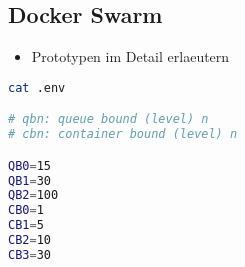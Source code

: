 \subsection{Docker Swarm}

\begin{itemize}
  \item Prototypen im Detail erlaeutern
\end{itemize}


\renewcommand\theadalign{bc}
\renewcommand\theadfont{\bfseries}
\renewcommand\theadgape{\Gape[4pt]}
\renewcommand\cellgape{\Gape[4pt]}


\begin{lstlisting}[language=bash]
cat .env

# qbn: queue bound (level) n
# cbn: container bound (level) n

QB0=15
QB1=30
QB2=100
CB0=1
CB1=5
CB2=10
CB3=30
\end{lstlisting}



